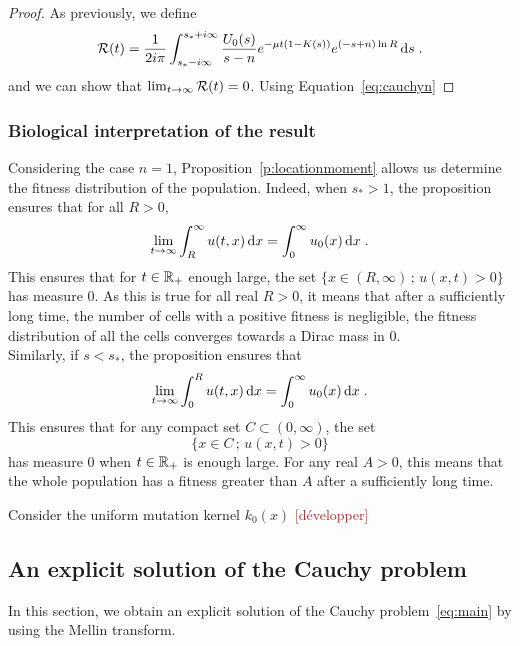 \documentclass[11pt]{amsart}
\newcommand{\R}{\RR}
\newcommand{\diff}{\,\mathrm{d}}
\newcommand{\ndr}[1]{\textcolor{brown}{[#1]}}
\begin{document}
\begin{proof}
        As previously, we define
        \begin{align*}
            \Rcal(t) = \frac{1}{2i\pi} \int_{s_*-i\infty}^{s_*+i\infty} \frac{U_0(s)}{s-n} e^{-\mu t(1 - K(s))} e^{(-s+n)\ln R} \diff s
            \eqfinp
        \end{align*}
        and we can show that $\lim_{t\to\infty}\mathcal{R}(t) = 0$. Using Equation~\ref{eq:cauchyn}
         \end{proof}

        
        \subsubsection{Biological interpretation of the result}
        Considering the case $n = 1$, Proposition~\ref{p:locationmoment} allows us determine the fitness distribution of the population. Indeed, when $s_* > 1$, the proposition ensures that for all $R > 0$, 
        \begin{align*}
            \lim_{t \to \infty} \int_R^\infty u(t,x) \diff x = \int_0^\infty u_0(x) \diff x \eqfinp
        \end{align*} 
        This ensures that for $t \in \mathbb{R}_+$ enough large, the set $\{ x \in (R, \infty) \,;\, u(x,t) > 0\}$ has measure $0$. As this is true for all real $R > 0$, it means that after a sufficiently long time, the number of cells with a positive fitness is negligible, \ie the fitness distribution of all the cells converges towards a Dirac mass in 0. \\

        Similarly, if $s<s_*$, the proposition ensures that 
        \begin{align*}
            \lim_{t \to \infty} \int_0^R u(t,x) \diff x = \int_0^\infty u_0(x) \diff x \eqfinp
        \end{align*} 
        This ensures that for any compact set $ C \subset (0, \infty)$, the set  $$\{ x \in C \,;\, u(x,t) > 0\}$$ has measure $0$ when $t \in \R_+$ is enough large. For any real $A > 0$, this means that the whole population has a fitness greater than $A$ after a sufficiently long time.

        \begin{example}
            Consider the uniform mutation kernel $k_0(x)$
            \ndr{développer}
        \end{example}

    \subsection{An explicit solution of the Cauchy problem}
    \label{s:explicit}
    In this section, we obtain an explicit solution of the Cauchy problem~\eqref{eq:main} by using the Mellin transform.
    
\end{document}
